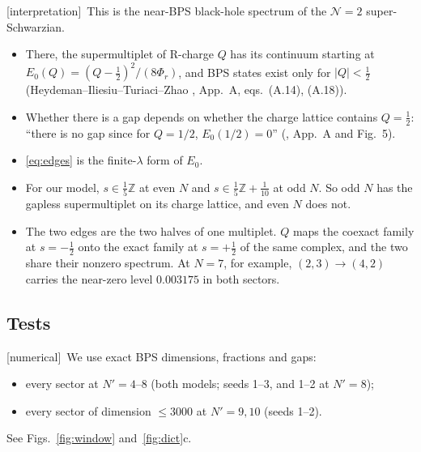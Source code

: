 \documentclass[11pt]{article}
\newcommand{\Np}{N'}
\newcommand{\tagbox}[2]{\textsf{\small\color{#1}[#2]}}
\newcommand{\NUM}{\tagbox{cnum}{numerical}}
\newcommand{\INTERP}{\tagbox{cconj}{interpretation}}
\theoremstyle{plain}
\theoremstyle{remark}
\numberwithin{equation}{section}
\begin{document}
\INTERP\ This is the near-BPS black-hole spectrum of the $\mathcal N=2$ super-Schwarzian.
\begin{itemize}\itemsep1pt
\item There, the supermultiplet of R-charge $Q$ has its continuum starting at $E_0(Q)=(Q-\tfrac12)^2/(8\Phi_r)$, and BPS
  states exist only for $|Q|<\tfrac12$ (Heydeman--Iliesiu--Turiaci--Zhao \cite{HITZ}, App.~A, eqs.~(A.14), (A.18)).
\item Whether there is a gap depends on whether the charge lattice contains $Q=\tfrac12$: ``there is no gap since for
  $Q=1/2$, $E_0(1/2)=0$'' (\cite{HITZ}, App.~A and Fig.~5).
\item \eqref{eq:edges} is the finite-$\lambda$ form of $E_0$.
\item For our model, $s\in\tfrac15\mathbb Z$ at even $N$ and $s\in\tfrac15\mathbb Z+\tfrac1{10}$ at odd $N$. So odd $N$
  has the gapless supermultiplet on its charge lattice, and even $N$ does not.
\item The two edges are the two halves of one multiplet. $Q$ maps the coexact family at $s=-\tfrac12$ onto the exact family
  at $s=+\tfrac12$ of the same complex, and the two share their nonzero spectrum. At $N=7$, for example, $(2,3)\to(4,2)$ carries
  the near-zero level $0.003175$ in both sectors.
\end{itemize}

\subsection{Tests}\label{sec:windowtests}

\NUM\ We use exact BPS dimensions, fractions and gaps:
\begin{itemize}\itemsep1pt
\item every sector at $\Np=4$--8 (both models; seeds 1--3, and 1--2 at $\Np=8$);
\item every sector of dimension $\le3000$ at $\Np=9,10$ (seeds 1--2).
\end{itemize}
See Figs.~\ref{fig:window} and~\ref{fig:dict}c.
\end{document}
